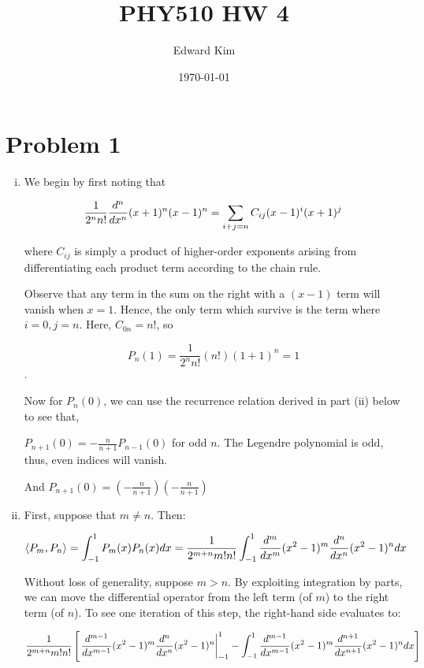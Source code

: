 \documentclass[12pt]{article}%
\title{PHY510 HW 4}
\author{Edward Kim}
\date{\today}
\newcommand{\Legen}[1][n]{(x^2 - 1)^{#1}}
\begin{document}
\maketitle

\section*{Problem 1}
\begin{enumerate}[i.]
  \item We begin by first noting that

  \begin{align*}
      \frac{1}{2^nn!}\totder[n](x+1)^n(x-1)^n = \sum_{i+j = n} C_{ij}(x-1)^i(x+1)^j
  \end{align*}


  where $C_{ij}$ is simply a product of higher-order exponents arising from differentiating each product term according to the chain rule.

  Observe that any term in the sum on the right with a $(x-1)$ term will vanish when $x=1$. Hence, the only term which survive is the term where $i=0,j=n$. Here, $C_{0n} = n!$, so

  \[ P_n(1) = \frac{1}{2^n n!} (n!)(1+1)^n = 1\].

  Now for $P_n(0)$, we can use the recurrence relation derived in part (ii) below to see that,

  $P_{n+1}(0) = -\frac{n}{n+1}P_{n-1}(0)$ for odd $n$. The Legendre polynomial is odd, thus, even indices will vanish.

  And $P_{n+1}(0) = (-\frac{n}{n+1})(-\frac{n}{n+1})$


  \item First, suppose that $m \neq n$. Then:

  \begin{equation} \label{eq:q1p1}
  \langle P_m, P_n \rangle = \int_{-1}^1 P_m(x)P_n(x) dx = \frac{1}{2^{m+n}m!n!}\int_{-1}^1 \totder[m]\Legen[m]\totder[n]\Legen dx
  \end{equation}

  Without loss of generality, suppose $m > n$. By exploiting integration by parts, we can move the differential operator from the left term (of $m$) to the right term (of $n$). To see one iteration of this step, the right-hand side evaluates to:

  \[\frac{1}{2^{m+n}m!n!} \left[ \left. \totder[m-1] \Legen[m] \totder[n]\Legen\right|_{-1}^1 - \int_{-1}^1 \totder[m-1] \Legen[m] \totder[n+1]\Legen dx \right]  \]


\end{enumerate}
\end{document}
